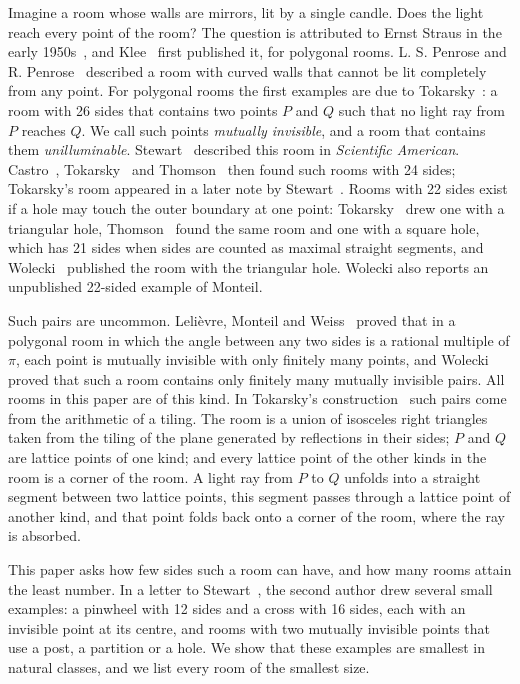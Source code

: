 \documentclass[11pt,a4paper]{article}
\theoremstyle{plain}
\theoremstyle{definition}
\theoremstyle{remark}
\numberwithin{equation}{section}
\begin{document}
Imagine a room whose walls are mirrors, lit by a single candle. Does the light reach every point of the room? The question is attributed to Ernst Straus in the early 1950s~\cite{Tok95}, and Klee~\cite{Klee} first published it, for polygonal rooms. L. S. Penrose and R. Penrose~\cite{Penrose} described a room with curved walls that cannot be lit completely from any point. For polygonal rooms the first examples are due to Tokarsky~\cite{Tok95}: a room with 26 sides that contains two points $P$ and $Q$ such that no light ray from $P$ reaches $Q$. We call such points \emph{mutually invisible}, and a room that contains them \emph{unilluminable}. Stewart~\cite{Stewart} described this room in \emph{Scientific American}. Castro~\cite{Castro}, Tokarsky~\cite[Figure~2]{Tok96} and Thomson~\cite{Thomson} then found such rooms with 24 sides; Tokarsky's room appeared in a later note by Stewart~\cite{Stewart97}. Rooms with 22 sides exist if a hole may touch the outer boundary at one point: Tokarsky~\cite[Figure~3(b)]{Tok96} drew one with a triangular hole, Thomson~\cite{Thomson} found the same room and one with a square hole, which has 21 sides when sides are counted as maximal straight segments, and Wolecki~\cite{Wolecki} published the room with the triangular hole. Wolecki also reports an unpublished 22-sided example of Monteil.

Such pairs are uncommon. Leli\`evre, Monteil and Weiss~\cite{LMW} proved that in a polygonal room in which the angle between any two sides is a rational multiple of $\pi$, each point is mutually invisible with only finitely many points, and Wolecki~\cite{Wolecki} proved that such a room contains only finitely many mutually invisible pairs. All rooms in this paper are of this kind. In Tokarsky's construction~\cite{Tok95} such pairs come from the arithmetic of a tiling. The room is a union of isosceles right triangles taken from the tiling of the plane generated by reflections in their sides; $P$ and $Q$ are lattice points of one kind; and every lattice point of the other kinds in the room is a corner of the room. A light ray from $P$ to $Q$ unfolds into a straight segment between two lattice points, this segment passes through a lattice point of another kind, and that point folds back onto a corner of the room, where the ray is absorbed.

This paper asks how few sides such a room can have, and how many rooms attain the least number. In a letter to Stewart~\cite{Tok96}, the second author drew several small examples: a pinwheel with 12 sides and a cross with 16 sides, each with an invisible point at its centre, and rooms with two mutually invisible points that use a post, a partition or a hole. We show that these examples are smallest in natural classes, and we list every room of the smallest size.
\end{document}
